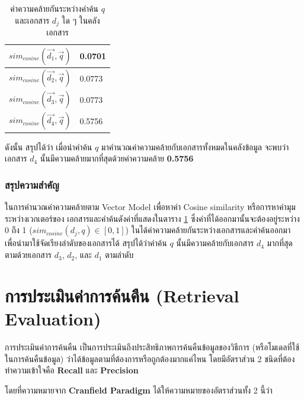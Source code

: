 \documentclass[11pt,a4paper]{article}
\begin{document}
{{{\begin{table}[ht!]
    \centering
    \caption{ค่าความคล้ายกันระหว่างคำค้น \emph{$q$} และเอกสาร \emph{$d_j$} ใด ๆ ในคลังเอกสาร}
    \label{tab:cosinesimcalculate}
    \begin{tabular}{|c|l|} 
        \hline
        $sim_{cosine}(\overrightarrow{d_1}, \overrightarrow{q})$   & 0.0701  \\
        \hline
        $sim_{cosine}(\overrightarrow{d_2}, \overrightarrow{q})$   & 0.0773 \\
        \hline
        $sim_{cosine}(\overrightarrow{d_3}, \overrightarrow{q})$   & 0.0773 \\
        \hline
        $sim_{cosine}(\overrightarrow{d_4}, \overrightarrow{q})$   & 0.5756 \\
        \hline
    \end{tabular}
\end{table}

ดังนั้น สรุปได้ว่า เมื่อนำคำค้น \emph{$q$} มาคำนวณค่าความคล้ายกับเอกสารทั้งหมดในคลังข้อมูล จะพบว่า 
เอกสาร \emph{$d_4$} นั้นมีความคล้ายมากที่สุดด้วยค่าความคล้าย {\bf 0.5756 } 

\subsubsection{สรุปความสำคัญ} 

ในการคำนวณค่าความคล้ายตาม Vector Model เพื่อหาค่า Cosine similarity หรือการหาค่ามุมระหว่างเวกเตอร์ของ
เอกสารและคำค้นดังค่าที่แสดงในตาราง \ref{tab:cosinesimcalculate} ซึ่งค่าที่ได้ออกมานั้นจะต้องอยู่ระหว่าง 0 ถึง 1 
($sim_{cosine}(d_j, q) \in [0, 1]$) ในได้ค่าความคล้ายกันระหว่างเอกสารและคำค้นออกมา 
เพื่อนำมาใช้จัดเรียงลำดับของเอกสารได้ สรุปได้ว่าคำค้น \emph{$q$} นั้นมีความคล้ายกับเอกสาร \emph{$d_4$} มากที่สุด 
ตามด้วยเอกสาร \emph{$d_3$}, \emph{$d_2$}, และ \emph{$d_1$} ตามลำดับ

\section{การประเมินค่าการค้นคืน (Retrieval Evaluation)}

การประเมินค่าการค้นคืน เป็นการประเมินถึงประสิทธิภาพการค้นคืนข้อมูลของวิธีการ (หรือโมเดลที่ใช้ในการค้นคืนข้อมูล) 
ว่าได้ข้อมูลตามที่ต้องการหรือถูกต้องมากแค่ไหน โดยมีอัตราส่วน 2 ชนิดที่ต้องทำความเข้าใจคือ {\bf Recall} และ {\bf Precision}

โดยที่ความหมายจาก {\bf Cranfield Paradigm} ได้ให้ความหมายของอัตราส่วนทั้ง 2 นี้ว่า

}}}
\end{document}
